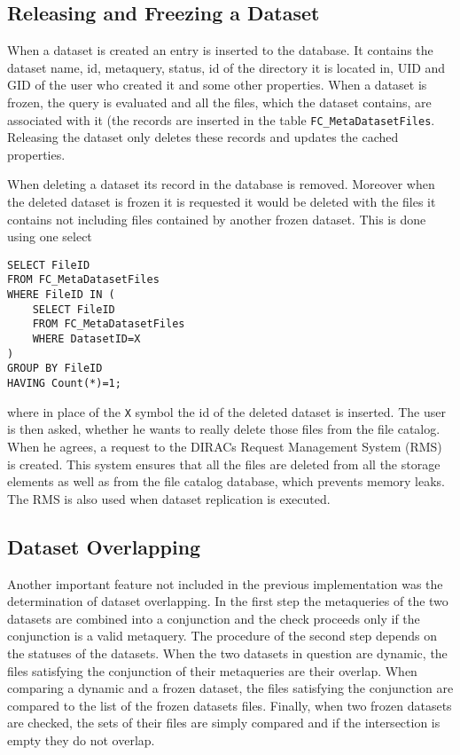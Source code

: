 \subsection{Releasing and Freezing a Dataset}

When a dataset is created an entry is inserted to the database. It contains the dataset name, id, metaquery, 
status, id of the directory it is located in, UID and GID of the user who created it and some other 
properties. When a dataset is frozen, the query is evaluated and all the files, which the
dataset contains, are associated with it (the records are inserted in the table \texttt{FC\_MetaDatasetFiles}.
Releasing the dataset only deletes these records and updates the cached properties. 

When deleting a dataset its record in the database is removed. Moreover when the deleted dataset is frozen
it is requested it would be deleted with the files it contains not including files contained by another frozen
dataset. This is done using one select

\begin{verbatim}
SELECT FileID 
FROM FC_MetaDatasetFiles 
WHERE FileID IN (
	SELECT FileID 
	FROM FC_MetaDatasetFiles 
	WHERE DatasetID=X
) 
GROUP BY FileID 
HAVING Count(*)=1;
\end{verbatim}

\noindent where in place of the \texttt{X} symbol the id of the deleted dataset is inserted. The user is then 
asked, whether he wants to really delete those files from the file catalog. When he agrees, a request to
the DIRACs Request Management System (RMS) is created. This system ensures that all the files
are deleted from all the storage elements as well as from the file catalog database, 
which prevents memory leaks. The RMS is also used when dataset replication is executed.

\subsection{Dataset Overlapping}

Another important feature not included in the previous implementation was the determination of  
dataset overlapping. In the first step the metaqueries of the two datasets are combined
into a conjunction and the check proceeds only if the conjunction is a valid metaquery.
The procedure of the second step depends on the statuses of the datasets. When the two
datasets in question are dynamic, the files satisfying the conjunction of their metaqueries
are their overlap. When comparing a dynamic and a frozen dataset, the files satisfying 
the conjunction are compared to the list of the frozen datasets files. Finally, when 
two frozen datasets are checked, the sets of their files are simply compared and if 
the intersection is empty they do not overlap.